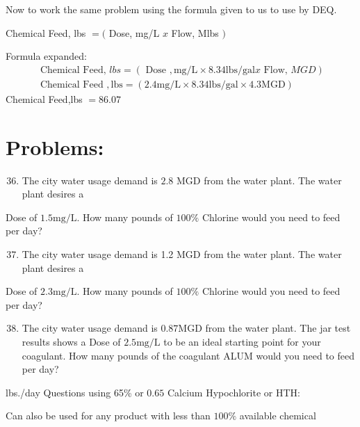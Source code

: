 \documentclass[10pt]{article}
\begin{document}
Now to work the same problem using the formula given to us to use by DEQ.

Chemical Feed, lbs $=($ Dose, mg/L $x$ Flow, Mlbs $)$

Formula expanded:
$$
\begin{gathered}
\text { Chemical Feed, } l b s=(\text { Dose }, \mathrm{mg} / \mathrm{L} \times 8.34 \mathrm{lbs} / \mathrm{gal} x \text { Flow, } M G D) \\
\text { Chemical Feed }, \mathrm{lbs}=(2.4 \mathrm{mg} / \mathrm{L} \times 8.34 \mathrm{lbs} / \mathrm{gal} \times 4.3 \mathrm{MGD})
\end{gathered}
$$
Chemical Feed,lbs $=86.07$

\section{Problems:}
\begin{enumerate}
  \setcounter{enumi}{35}
  \item The city water usage demand is $2.8$ MGD from the water plant. The water plant desires a
\end{enumerate}
Dose of $1.5 \mathrm{mg} / \mathrm{L}$. How many pounds of $100 \%$ Chlorine would you need to feed per day?

\begin{enumerate}
  \setcounter{enumi}{36}
  \item The city water usage demand is 1.2 MGD from the water plant. The water plant desires a
\end{enumerate}
Dose of $2.3 \mathrm{mg} / \mathrm{L}$. How many pounds of $100 \%$ Chlorine would you need to feed per day?

\begin{enumerate}
  \setcounter{enumi}{37}
  \item The city water usage demand is $0.87 \mathrm{MGD}$ from the water plant. The jar test results shows a Dose of $2.5 \mathrm{mg} / \mathrm{L}$ to be an ideal starting point for your coagulant. How many pounds of the coagulant ALUM would you need to feed per day?
\end{enumerate}
lbs./day Questions using 65\% or $0.65$ Calcium Hypochlorite or HTH:

Can also be used for any product with less than $100 \%$ available chemical
\end{document}
